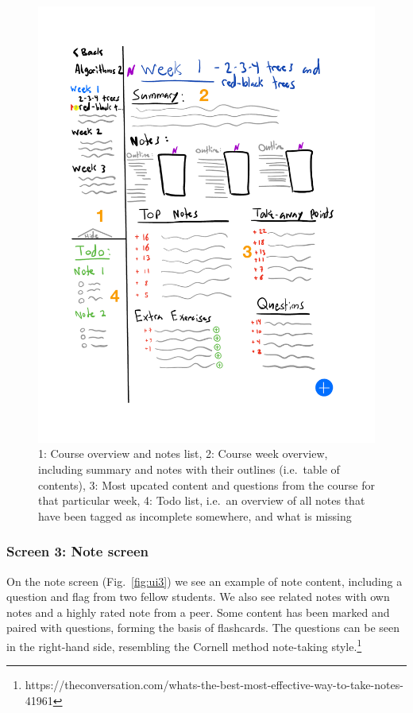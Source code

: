 \begin{figure}
\centering
\includegraphics{assets/Flashnotev2-2.pdf}
\caption{1: Course overview and notes list, 2: Course week overview,
including summary and notes with their outlines (i.e.~table of
contents), 3: Most upcated content and questions from the course for
that particular week, 4: Todo list, i.e.~an overview of all notes that
have been tagged as incomplete somewhere, and what is
missing}\label{fig:ui2}
\end{figure}

\subsubsection{Screen 3: Note screen}\label{screen-3-note-screen}

On the note screen (Fig.~\ref{fig:ui3}) we see an example of note
content, including a question and flag from two fellow students. We also
see related notes with own notes and a highly rated note from a peer.
Some content has been marked and paired with questions, forming the
basis of flashcards. The questions can be seen in the right-hand side,
resembling the Cornell method note-taking style.\footnote{https://theconversation.com/whats-the-best-most-effective-way-to-take-notes-41961}

